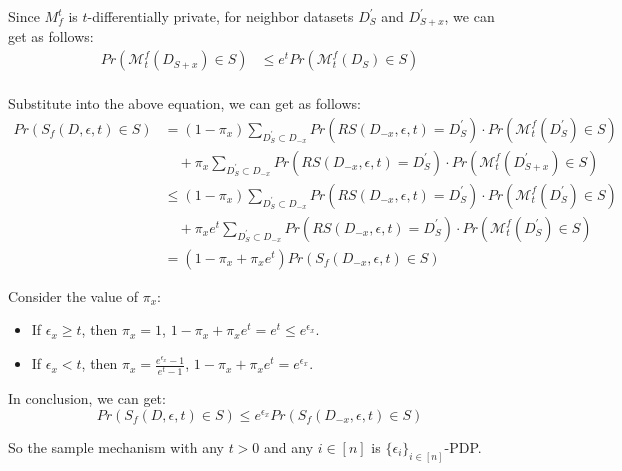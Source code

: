 \documentclass[a4paper,12pt]{article}
\begin{document}
Since $M_{f}^{t}$ is $t$-differentially private, for neighbor datasets $D_S^{'}$ and $D_{S + x}^{'}$, we can get as follows:
\begin{equation}
    \begin{aligned}
        Pr(\mathcal{M}_{t}^{f}(D_{S + x}) \in S) & \leq e^{t} Pr(\mathcal{M}_{t}^{f}(D_S) \in S) \\
    \end{aligned}
\end{equation}

Substitute into the above equation, we can get as follows:
\begin{equation}
    \begin{aligned}
        Pr(S_f(D, \epsilon, t) \in S) & = (1 - \pi_x)\sum_{D_{S}^{'} \subset D_{-x}}Pr(RS(D_{-x}, \epsilon, t) = D_{S}^{'}) \cdot Pr(\mathcal{M}_{t}^{f}(D_{S}^{'}) \in S)     \\
                                      & \quad + \pi_x\sum_{D_{S}^{'} \subset D_{-x}}Pr(RS(D_{-x}, \epsilon, t) = D_{S}^{'}) \cdot Pr(\mathcal{M}_{t}^{f}(D_{S+ x}^{'}) \in S)  \\
                                      & \leq (1 - \pi_x)\sum_{D_{S}^{'} \subset D_{-x}}Pr(RS(D_{-x}, \epsilon, t) = D_{S}^{'}) \cdot Pr(\mathcal{M}_{t}^{f}(D_{S}^{'}) \in S)     \\
                                      & \quad + \pi_x e^{t}\sum_{D_{S}^{'} \subset D_{-x}}Pr(RS(D_{-x}, \epsilon, t) = D_{S}^{'}) \cdot Pr(\mathcal{M}_{t}^{f}(D_S^{'}) \in S) \\
                                      & = (1 - \pi_x + \pi_x e^{t}) Pr(S_f(D_{-x}, \epsilon, t) \in S)
    \end{aligned}
\end{equation}

Consider the value of $\pi_x$:
\begin{itemize}
    \item If $\epsilon_x \geq t$, then $\pi_x = 1$, $1 - \pi_x + \pi_x e^{t} = e^{t} \leq e^{\epsilon_x}$.
    \item If $\epsilon_x < t$, then $\pi_x = \frac{e^{\epsilon_x} - 1}{e^t - 1}$, $1 - \pi_x + \pi_x e^{t} = e^{\epsilon_x}$.
\end{itemize}
In conclusion, we can get:
\begin{equation}
    Pr(S_f(D, \epsilon, t) \in S) \leq e^{\epsilon_x} Pr(S_f(D_{-x}, \epsilon, t) \in S)
\end{equation}

So the sample mechanism with any $t > 0$ and any $i \in [n]$ is $\{\epsilon_i\}_{i\in [n]}$-PDP.
\end{document}
